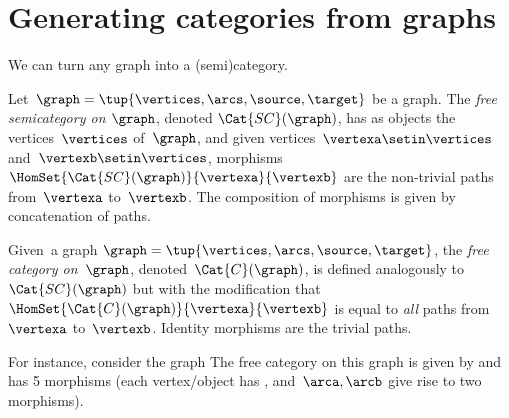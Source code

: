 
\section[Categories from graphs]{Generating categories from graphs}
\label{sec:catsfromgraphs}

We can turn any graph into a (semi)category.

\begin{ctdefinition}
    \label{def:free-semicategory}
    Let~$\graph=\tup{\vertices,\arcs,\source,\target}$ be a graph.
    The \emph{free semicategory on $\graph$}, denoted $\Cat{SC}(\graph)$, has as objects the vertices~$\vertices$ of~$\graph$, and given vertices~$\vertexa\setin \vertices$ and~$\vertexb\setin \vertices$, morphisms~$\HomSet{\Cat{SC}(\graph)}{\vertexa}{\vertexb}$ are the non-trivial paths from~$\vertexa$ to~$\vertexb$.
    The composition of morphisms is given by concatenation of paths.
\end{ctdefinition}

\begin{ctdefinition}
    \label{def:free-category}
    Given~a graph $\graph=\tup{\vertices,\arcs,\source,\target}$, the \emph{free category on~$\graph$}, denoted~$\Cat{C}(\graph)$, is defined analogously to $\Cat{SC}(\graph)$ but with the modification that $\HomSet{\Cat{C}(\graph)}{\vertexa}{\vertexb}$ is equal to \emph{all} paths from~$\vertexa$ to~$\vertexb$.
    Identity morphisms are the trivial paths.
\end{ctdefinition}

For instance, consider the graph
%
%
The free category on this graph is given by
%
%
and has 5 morphisms (each vertex/object has , and~$\arca,\arcb$ give rise to two morphisms).

